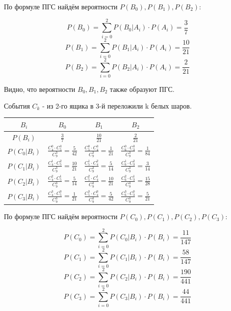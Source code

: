 \begin{enumerate}
	По формуле ПГС найдём вероятности $P(B_0), P(B_1), P(B_2)$:
	
	\[ P(B_0) = \sum_{i=0}^{2} P(B_0|A_i) \cdot P(A_i) = \dfrac{3}{7} \]
	\[ P(B_1) = \sum_{i=0}^{2} P(B_1|A_i) \cdot P(A_i) = \dfrac{10}{21} \]
	\[ P(B_2) = \sum_{i=0}^{2} P(B_2|A_i) \cdot P(A_i) = \dfrac{2}{21} \]
	
	Видно, что вероятности $B_0, B_1, B_2$ также образуют ПГС.
	
	События $C_k$ - из 2-го ящика в 3-й переложили k белых шаров.
	
	\begin{table}[h]
		\centering
		\begin{tabular}{|c|c|c|c|}
			\hline
			$B_i$        & $B_0$                                             & $B_1$                                             & $B_2$                                             \\ \hline
			$P(B_i)$     & $\frac{3}{7}$                                     & $\frac{10}{21}$                                   & $\frac{2}{21}$                                    \\ \hline
			$P(C_0|B_i)$ & $\frac{C_4^0 \cdot C_5^3}{C_9^3} = \frac{5}{42}$  & $\frac{C_5^0 \cdot C_4^3}{C_9^3} = \frac{1}{21}$  & $\frac{C_6^0 \cdot C_3^3}{C_9^3} = \frac{1}{84}$  \\ \hline
			$P(C_1|B_i)$ & $\frac{C_4^1 \cdot C_5^2}{C_9^3} = \frac{10}{21}$ & $\frac{C_5^1 \cdot C_4^2}{C_9^3} = \frac{5}{14}$  & $\frac{C_6^1 \cdot C_3^2}{C_9^3} = \frac{3}{14}$  \\ \hline
			$P(C_2|B_i)$ & $\frac{C_4^2 \cdot C_5^1}{C_9^3} = \frac{5}{14}$  & $\frac{C_5^2 \cdot C_4^1}{C_9^3} = \frac{10}{21}$ & $\frac{C_6^2 \cdot C_3^1}{C_9^3} = \frac{15}{28}$ \\ \hline
			$P(C_3|B_i)$ & $\frac{C_4^3 \cdot C_5^0}{C_9^3} = \frac{1}{21}$  & $\frac{C_5^3 \cdot C_4^0}{C_9^3} = \frac{5}{42}$  & $\frac{C_6^3 \cdot C_3^0}{C_9^3} = \frac{5}{21}$  \\ \hline
		\end{tabular}
	\end{table}
	
	По формуле ПГС найдём вероятности $P(C_0), P(C_1), P(C_2), P(C_3)$:
	
	\[ P(C_0) = \sum_{i=0}^{2} P(C_0|B_i) \cdot P(B_i) = \dfrac{11}{147} \]
	\[ P(C_1) = \sum_{i=0}^{2} P(C_1|B_i) \cdot P(B_i) = \dfrac{58}{147} \]
	\[ P(C_2) = \sum_{i=0}^{2} P(C_2|B_i) \cdot P(B_i) = \dfrac{190}{441} \]
	\[ P(C_3) = \sum_{i=0}^{2} P(C_3|B_i) \cdot P(B_i) = \dfrac{44}{441} \]
	

\end{enumerate}

